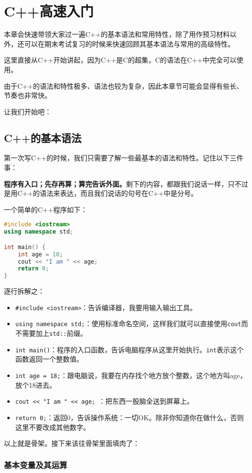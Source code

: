 \documentclass[../main.tex]{subfiles}
\begin{document}
\chapter{C++高速入门}

本章会快速带领大家过一遍C++的基本语法和常用特性，除了用作预习材料以外，还可以在期末考试复习的时候来快速回顾其基本语法与常用的高级特性。

这里直接从C++开始讲起，因为C++是C的超集，C的语法在C++中完全可以使用。

由于C++的语法和特性极多、语法也较为复杂，因此本章节可能会显得有些长、节奏也非常快。

让我们开始吧：

\section{C++的基本语法}

第一次写C++的时候，我们只需要了解一些最基本的语法和特性。记住以下三件事：

\textbf{程序有入口；先存再算；算完告诉外面。}剩下的内容，都跟我们说话一样，只不过是用C++的语法来表达，而且我们说话的句号在C++中是分号。

一个简单的C++程序如下：
\begin{lstlisting}[language=C++]
#include <iostream>
using namespace std;

int main() {
    int age = 18;
    cout << "I am " << age;
    return 0;
}
\end{lstlisting}
逐行拆解之：
\begin{itemize}
  \item \texttt{\#include <iostream>}：告诉编译器，我要用输入输出工具。
  \item \texttt{using namespace std;}：使用标准命名空间，这样我们就可以直接使用\texttt{cout}而不需要加上\texttt{std::}前缀。
  \item \texttt{int main()}：程序的入口函数，告诉电脑程序从这里开始执行。\texttt{int}表示这个函数返回一个整数值。
  \item \texttt{int age = 18;}：跟电脑说，我要在内存找个地方放个整数，这个地方叫age，放个18进去。
  \item \texttt{cout << "I am " << age; }：把东西一股脑全送到屏幕上。
  \item \texttt{return 0;}：返回0，告诉操作系统：一切OK。除非你知道你在做什么，否则这里不要改成其他数字。
\end{itemize}

以上就是骨架。接下来该往骨架里面填肉了：

\subsection{基本变量及其运算}
\end{document}

